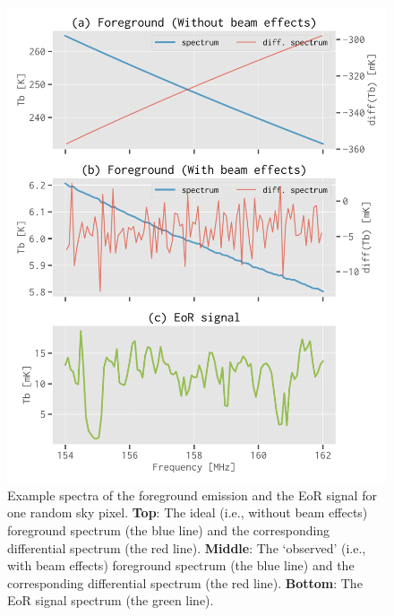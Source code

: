 \documentclass[fleqn,usenatbib]{mnras}
\begin{document}
\begin{figure}
  \centering
  \includegraphics[width=\columnwidth]{simudata}
  \caption{\label{fig:simudata}%
    Example spectra of the foreground emission and the EoR signal for one
    random sky pixel.
    \textbf{Top}: The ideal (i.e., without beam effects) foreground
    spectrum (the blue line) and the corresponding differential spectrum
    (the red line).
    \textbf{Middle}: The `observed' (i.e., with beam effects) foreground
    spectrum (the blue line) and the corresponding differential spectrum
    (the red line).
    \textbf{Bottom}: The EoR signal spectrum (the green line).
  }
\end{figure}
\end{document}
